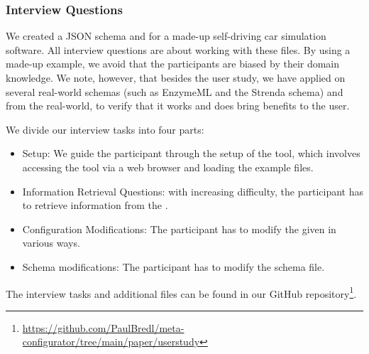 \subsubsection{Interview Questions}
We created a JSON schema and \cfgfile{} for a made-up self-driving car simulation software.
All interview questions are about working with these files.
By using a made-up example, we avoid that the participants are biased by their domain knowledge.
We note, however, that besides the user study, we have applied \toolname{} on several real-world schemas (such as EnzymeML\cite{pyenzyme} and the Strenda schema\cite{strenda}) and \cfgfiles{} from the real-world, to verify that it works and does bring benefits to the user.

We divide our interview tasks into four parts:
\begin{itemize}
    \item Setup: We guide the participant through the setup of the tool, which involves accessing the tool via a web browser and loading the example files.
    \item Information Retrieval Questions: with increasing difficulty, the participant has to retrieve information from the \cfgfile{}.
    \item Configuration Modifications: The participant has to modify the given \cfgfile{} in various ways.
    \item Schema modifications: The participant has to modify the schema file.
\end{itemize}

The interview tasks and additional files can be found in our GitHub repository\footnote{\url{https://github.com/PaulBredl/meta-configurator/tree/main/paper/userstudy}}.

